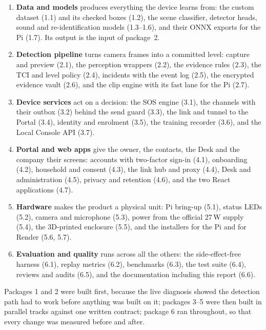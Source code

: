 \begin{enumerate}
\item \textbf{Data and models} produces everything the device learns from: the custom dataset (1.1) and its checked boxes (1.2), the scene classifier, detector heads, sound and re-identification models (1.3--1.6), and their ONNX exports for the Pi (1.7). Its output is the input of package~2.
\item \textbf{Detection pipeline} turns camera frames into a committed level: capture and preview (2.1), the perception wrappers (2.2), the evidence rules (2.3), the TCI and level policy (2.4), incidents with the event log (2.5), the encrypted evidence vault (2.6), and the clip engine with its fast lane for the Pi (2.7).
\item \textbf{Device services} act on a decision: the SOS engine (3.1), the channels with their outbox (3.2) behind the send guard (3.3), the link and tunnel to the Portal (3.4), identity and enrolment (3.5), the training recorder (3.6), and the Local Console API (3.7).
\item \textbf{Portal and web apps} give the owner, the contacts, the Desk and the company their screens: accounts with two-factor sign-in (4.1), onboarding (4.2), household and consent (4.3), the link hub and proxy (4.4), Desk and administration (4.5), privacy and retention (4.6), and the two React applications (4.7).
\item \textbf{Hardware} makes the product a physical unit: Pi bring-up (5.1), status LEDs (5.2), camera and microphone (5.3), power from the official 27\,W supply (5.4), the 3D-printed enclosure (5.5), and the installers for the Pi and for Render (5.6, 5.7).
\item \textbf{Evaluation and quality} runs across all the others: the side-effect-free harness (6.1), replay metrics (6.2), benchmarks (6.3), the test suite (6.4), reviews and audits (6.5), and the documentation including this report (6.6).
\end{enumerate}
Packages 1 and 2 were built first, because the live diagnosis showed the detection path had to work before anything was built on it; packages 3--5 were then built in parallel tracks against one written contract; package 6 ran throughout, so that every change was measured before and after.


